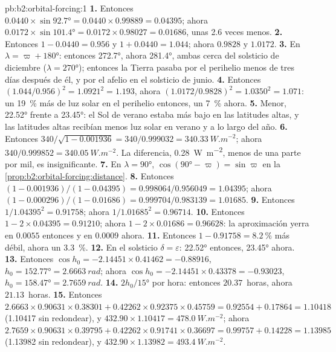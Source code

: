 \begin{solution}{pb:b2:orbital-forcing:1}
\textbf{1.} Entonces $0.0440 \times \sin\ang{92.7} = 0.0440 \times 0.99889 = 0.04395$; ahora $0.0172 \times
\sin\ang{101.4} = 0.0172 \times 0.98027 = 0.01686$, unas 2.6 veces menos.
\textbf{2.} Entonces $1 - 0.0440 = 0.956$ y $1 + 0.0440 = 1.044$; ahora $0.9828$ y $1.0172$.
\textbf{3.} En $\lambda = \varpi + \ang{180}$: entonces \ang{272.7}, ahora \ang{281.4}, ambas cerca del
solsticio de diciembre ($\lambda = \ang{270}$); entonces la Tierra pasaba por el perihelio menos de tres días
después de él, y por el afelio en el solsticio de junio.
\textbf{4.} Entonces $(1.044/0.956)^2 = 1.0921^2 = 1.193$, ahora $(1.0172/0.9828)^2 = 1.0350^2 = 1.071$:
un \qty{19}{\percent} más de luz solar en el perihelio entonces, un \qty{7}{\percent} ahora.
\textbf{5.} Menor, \ang{22.52} frente a \ang{23.45}: el Sol de verano estaba más bajo en las latitudes altas,
y las latitudes altas recibían menos luz solar en verano y a lo largo del año.
\textbf{6.} Entonces $340/\sqrt{1 - 0.001936} = 340/0.999032 = \qty{340.33}{W.m^{-2}}$; ahora $340/0.999852
= \qty{340.05}{W.m^{-2}}$. La diferencia, \qty{0.28}{W.m^{-2}}, menos de una parte por mil,
es insignificante.
\textbf{7.} En $\lambda = \ang{90}$, $\cos(\ang{90} - \varpi) = \sin\varpi$ en la
\cref{prop:b2:orbital-forcing:distance}.
\textbf{8.} Entonces $(1 - 0.001936)/(1 - 0.04395) = 0.998064/0.956049 = 1.04395$; ahora $(1 -
0.000296)/(1 - 0.01686) = 0.999704/0.983139 = 1.01685$.
\textbf{9.} Entonces $1/1.04395^2 = 0.91758$; ahora $1/1.01685^2 = 0.96714$.
\textbf{10.} Entonces $1 - 2 \times 0.04395 = 0.91210$; ahora $1 - 2 \times 0.01686 = 0.96628$: la
aproximación yerra en $0.0055$ entonces y en $0.0009$ ahora.
\textbf{11.} Entonces $1 - 0.91758 = \qty{8.2}{\percent}$ más débil, ahora un \qty{3.3}{\percent}.
\textbf{12.} En el solsticio $\delta = \varepsilon$: \ang{22.52} entonces, \ang{23.45} ahora.
\textbf{13.} Entonces $\cos h_0 = -2.14451 \times 0.41462 = -0.88916$, $h_0 = \ang{152.77} =
\qty{2.6663}{rad}$; ahora $\cos h_0 = -2.14451 \times 0.43378 = -0.93023$, $h_0 = \ang{158.47} =
\qty{2.7659}{rad}$.
\textbf{14.} $2h_0/\ang{15}$ por hora: entonces $20.37$~horas, ahora $21.13$~horas.
\textbf{15.} Entonces $2.6663 \times 0.90631 \times 0.38301 + 0.42262 \times 0.92375 \times 0.45759 =
0.92554 + 0.17864 = 1.10418$ (\num{1.10417} sin redondear), y $432.90 \times 1.10417 =
\qty{478.0}{W.m^{-2}}$; ahora $2.7659 \times 0.90631 \times 0.39795 + 0.42262 \times 0.91741 \times
0.36697 = 0.99757 + 0.14228 = 1.13985$ (\num{1.13982} sin redondear), y $432.90 \times 1.13982 = \qty{493.4}{W.m^{-2}}$.

\end{solution}
